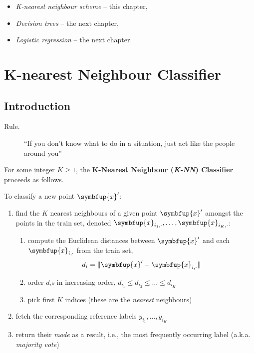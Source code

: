 \documentclass[10pt,b5paper,krantz1]{krantz}
\providecommand{\tightlist}{%
  \setlength{\itemsep}{0pt}\setlength{\parskip}{0pt}}
\renewcommand{\mathbf}[1]{\symbfup{#1}}
\begin{document}
\begin{itemize}
\tightlist
\item
  \emph{K-nearest neighbour scheme} -- this chapter,
\item
  \emph{Decision trees} -- the next chapter,
\item
  \emph{Logistic regression} -- the next chapter.
\end{itemize}

\hypertarget{k-nearest-neighbour-classifier}{%
\section{K-nearest Neighbour Classifier}\label{k-nearest-neighbour-classifier}}

\hypertarget{introduction-4}{%
\subsection{Introduction}\label{introduction-4}}

\begin{description}
\item[Rule.]
``If you don't know what to do in a situation, just act like the people around you''
\end{description}

For some integer \(K\ge 1\), the \textbf{K-Nearest Neighbour (\emph{K-NN}) Classifier}
proceeds as follows.

To classify a new point \(\mathbf{x}'\):

\begin{enumerate}
\def\labelenumi{\arabic{enumi}.}
\tightlist
\item
  find the \(K\) nearest neighbours of a given point \(\mathbf{x}'\) amongst the points in the train set,
  denoted \(\mathbf{x}_{i_1,\cdot}, \dots, \mathbf{x}_{i_K,\cdot}\):

  \begin{enumerate}
  \def\labelenumii{\alph{enumii}.}
  \tightlist
  \item
    compute the Euclidean distances between \(\mathbf{x}'\) and each \(\mathbf{x}_{i,\cdot}\) from the train set,
    \[d_i = \|\mathbf{x}'-\mathbf{x}_{i,\cdot}\|\]
  \item
    order \(d_i\)s in increasing order,
    \(d_{i_1} \le d_{i_2} \le \dots \le d_{i_K}\)
  \item
    pick first \(K\) indices (these are the \emph{nearest} neighbours)
  \end{enumerate}
\item
  fetch the corresponding reference labels \(y_{i_1}, \dots, y_{i_K}\)
\item
  return their \emph{mode} as a result, i.e., the most frequently occurring label (a.k.a. \emph{majority vote})
\end{enumerate}
\end{document}
